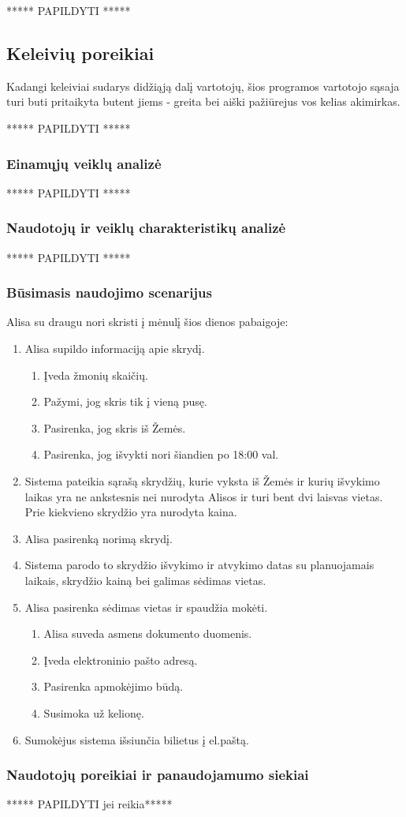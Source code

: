 \documentclass{VUMIFPSkursinis}
\begin{document}
\centerline{***** PAPILDYTI *****}

\subsection{Keleivių poreikiai}
Kadangi keleiviai sudarys didžiąją dalį vartotojų, šios programos vartotojo sąsaja turi buti pritaikyta butent jiems - greita bei aiški pažiūrejus vos kelias akimirkas.
\centerline{***** PAPILDYTI *****}

\subsubsection{Einamųjų veiklų analizė}
\centerline{***** PAPILDYTI *****}

\subsubsection{Naudotojų ir veiklų charakteristikų analizė}
\centerline{***** PAPILDYTI *****}

\subsubsection{Būsimasis naudojimo scenarijus}
Alisa su draugu nori skristi į mėnulį šios dienos pabaigoje:
\begin{enumerate}
\item  Alisa supildo informaciją apie skrydį.
\begin{enumerate}[label*=\arabic*.]
\item Įveda žmonių skaičių.
\item Pažymi, jog skris tik į vieną pusę.
\item Pasirenka, jog skris iš Žemės.
\item  Pasirenka, jog išvykti nori šiandien po 18:00 val.
\end{enumerate}
\item  Sistema pateikia sąrašą skrydžių, kurie vyksta iš Žemės ir kurių išvykimo laikas yra ne ankstesnis nei nurodyta Alisos ir turi bent dvi laisvas vietas. Prie kiekvieno skrydžio yra nurodyta kaina.
\item Alisa pasirenką norimą skrydį.
\item Sistema parodo to skrydžio išvykimo ir atvykimo datas su planuojamais laikais, skrydžio kainą bei galimas sėdimas vietas.
\item Alisa pasirenka sėdimas vietas ir spaudžia mokėti.
\begin{enumerate}[label*=\arabic*.]
\item Alisa suveda asmens dokumento duomenis.
\item Įveda elektroninio pašto adresą.
\item Pasirenka apmokėjimo būdą.
\item  Susimoka už kelionę.
\end{enumerate}
\item   Sumokėjus sistema išsiunčia  bilietus į el.paštą.
\end{enumerate}

\subsubsection{Naudotojų poreikiai ir panaudojamumo siekiai}
\centerline{***** PAPILDYTI jei reikia*****}


\printbibliography[heading=bibintoc, title=Šaltiniai]  %
\end{document}
